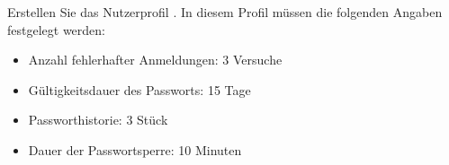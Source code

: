     \item Erstellen Sie das Nutzerprofil . In diesem Profil müssen die folgenden Angaben festgelegt werden:
      \begin{itemize}
        \item Anzahl fehlerhafter Anmeldungen: 3 Versuche
        \item Gültigkeitsdauer des Passworts: 15 Tage
        \item Passworthistorie: 3 Stück
        \item Dauer der Passwortsperre: 10 Minuten
      \end{itemize}
